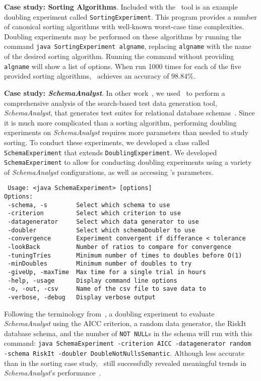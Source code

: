     \lstset{language=bash}

    {\bf Case study: Sorting Algorithms}.  Included with the
    \toolname~tool is an example doubling experiment called
    \texttt{SortingExperiment}.  This program provides a number of
    canonical sorting algorithms with well-known worst-case time
    complexities.  Doubling experiments may be performed on these
    algorithms by running the command \texttt{java SortingExperiment
    algname}, replacing \texttt{algname} with the name of the desired
    sorting algorithm. Running the command without providing
    \texttt{algname} will show a list of options. When run 1000 times
    for each of the five provided sorting algorithms, \toolname~achieves
    an accuracy of $98.84\%$.

    {\bf Case study: \textit{SchemaAnalyst}}. In other
    work~\cite{kinneer2015}, we used \toolname~to perform a
    comprehensive analysis of the search-based test data generation
    tool, \textit{SchemaAnalyst}, that generates test suites for
    relational database schemas~\cite{kapfhammer2013}. Since it is much
    more complicated than a sorting algorithm, performing doubling
    experiments on \textit{SchemaAnalyst} requires more parameters than
    needed to study sorting.  To conduct these experiments, we developed
    a class called \texttt{SchemaExperiment} that extends
    \texttt{DoublingExperiment}.  We developed \texttt{SchemaExperiment}
    to allow for conducting doubling experiments using a variety of
    \textit{SchemaAnalyst} configurations, as well as accessing
    \toolname's parameters.

    \vspace*{-.075in}

{\scriptsize
\begin{verbatim}
 Usage: <java SchemaExperiment> [options]
Options:
 -schema, -s        Select which schema to use
 -criterion         Select which criterion to use
 -datagenerator     Select which data generator to use
 -doubler           Select which schemaDoubler to use
 -convergence       Experiment convergent if differance < tolerance
 -lookBack          Number of ratios to compare for convergence
 -tuningTries       Minimum number of times to doubles before O(1)
 -minDoubles        Minimum number of doubles to try
 -giveUp, -maxTime  Max time for a single trial in hours
 -help, -usage      Display command line options
 -o, -out, -csv     Name of the csv file to save data to
 -verbose, -debug   Display verbose output
\end{verbatim}
}

\vspace*{-.075in}

Following the terminology from~\cite{kempka2015}, a doubling experiment
to evaluate \textit{SchemaAnalyst} using the AICC criterion, a random
data generator, the RiskIt database schema, and the number of
\texttt{NOT NULL}s in the schema will run with this command:
\texttt{java SchemaExperiment -criterion AICC -datagenerator random
-schema RiskIt -doubler DoubleNotNullsSemantic}.  Although less accurate
than in the sorting case study, \toolname~still successfully revealed
meaningful trends in \textit{SchemaAnalyst}'s
performance~\cite{kinneer2015}.


